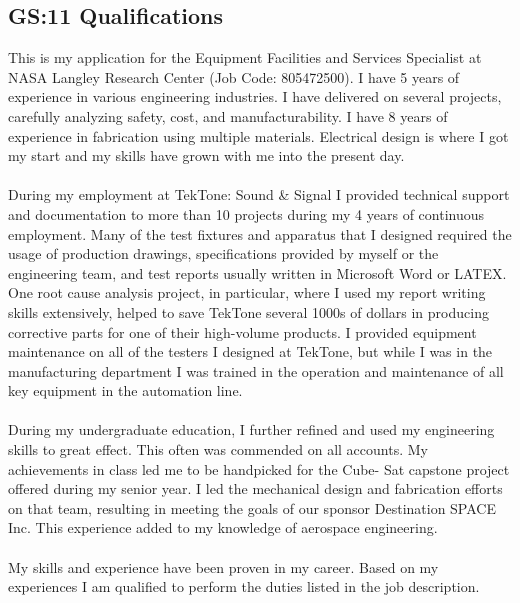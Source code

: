 \documentclass[allblack]{simplehipstercv}
\begin{document}
\begin{paracol}{2}
\section*{GS:11 Qualifications}
    This is my application for the Equipment Facilities and Services Specialist at NASA Langley Research
    Center (Job Code: 805472500). I have 5 years of experience in various engineering industries. I have
    delivered on several projects, carefully analyzing safety, cost, and manufacturability. I have 8 years
    of experience in fabrication using multiple materials. Electrical design is where I got my start and my skills
    have grown with me into the present day.\\
    \\
    During my employment at TekTone: Sound \& Signal I provided technical support and documentation
    to more than 10 projects during my 4 years of continuous employment. Many of the test fixtures and apparatus that I designed required the usage of production drawings, specifications provided by myself or
    the engineering team, and test reports usually written in Microsoft Word or LATEX. One root cause analysis project, in particular, where I used my report writing skills extensively, helped to save TekTone several
    1000s of dollars in producing corrective parts for one of their high-volume products. I provided equipment
    maintenance on all of the testers I designed at TekTone, but while I was in the manufacturing department
    I was trained in the operation and maintenance of all key equipment in the automation line.\\
    \\
    During my undergraduate education, I further refined and used my engineering skills to great effect. This
    often was commended on all accounts. My achievements in class led me to be handpicked for the Cube-
    Sat capstone project offered during my senior year. I led the mechanical design and fabrication efforts on
    that team, resulting in meeting the goals of our sponsor Destination SPACE Inc. This experience added to
    my knowledge of aerospace engineering.\\
    \\
    My skills and experience have been proven in my career. Based on my experiences I am qualified to
    perform the duties listed in the job description. %


\end{paracol}
\end{document}
